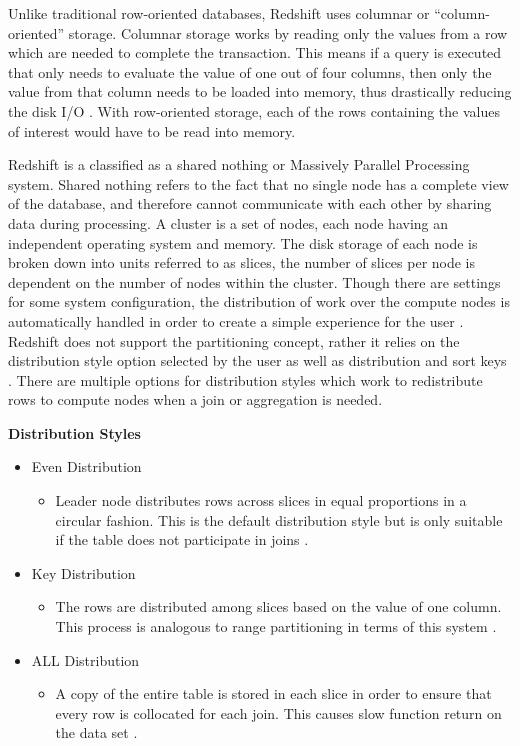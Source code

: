 \documentclass[draftclsnofoot, onecolumn, compsoc, 10pt]{IEEEtran}
\begin{document}
Unlike traditional row-oriented databases, Redshift uses columnar or “column-oriented” storage.
Columnar storage works by reading only the values from a row which are needed to complete the transaction.
This means if a query is executed that only needs to evaluate the value of one out of four columns, then only the value from that column needs to be loaded into memory, thus drastically reducing the disk I/O \cite{Tuning Query Performance}.
With row-oriented storage, each of the rows containing the values of interest would have to be read into memory.

Redshift is a classified as a shared nothing or Massively Parallel Processing system.
Shared nothing refers to the fact that no single node has a complete view of the database, and therefore cannot communicate with each other by sharing data during processing.
A cluster is a set of nodes, each node having an independent operating system and memory. The disk storage of each node is broken down into units referred to as slices, the number of slices per node is dependent on the number of nodes within the cluster.
Though there are settings for some system configuration, the distribution of work over the compute nodes is automatically handled in order to create a simple experience for the user \cite{Choosing A Data Distribution Style}.
Redshift does not support the partitioning concept, rather it relies on the distribution style option selected by the user as well as distribution and sort keys \cite{Unsupported Postgresql Features}.
There are multiple options for distribution styles which work to redistribute rows to compute nodes when a join or aggregation is needed.

\textbf{Distribution Styles}
\begin{itemize} 
	\item  Even Distribution
    \begin{itemize} 
		\item Leader node distributes rows across slices in equal proportions in a circular fashion. This is the default distribution style 		but is only suitable  if the table does not participate in joins \cite{Choosing A Data Distribution Style}.
    \end{itemize}
    \item Key Distribution
    \begin{itemize} 
		\item The rows are distributed among slices based on the value of one column. This process is analogous to range partitioning in 			terms of this system \cite{Choosing A Data Distribution Style}.
    \end{itemize}
    \item ALL Distribution
    \begin{itemize} 
		\item A copy of the entire table is stored in each slice in order to ensure that every row is collocated for each join. This causes 		slow function return on the data set \cite{Choosing A Data Distribution Style}.
    \end{itemize}
\end{itemize}
\end{document}
